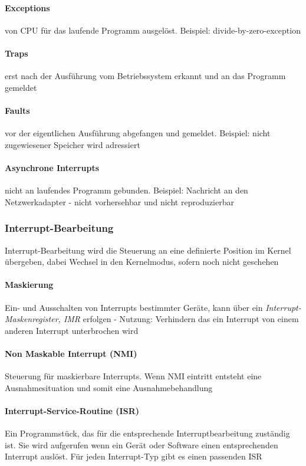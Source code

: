 \documentclass[11pt,a4paper,landscape]{article}
\begin{document}
\begin{multicols*}{3}
	\paragraph{Exceptions} von CPU für das laufende Programm ausgelöst. Beispiel: divide-by-zero-exception
	\paragraph{Traps} erst nach der Ausführung vom Betriebssystem erkannt und an das Programm gemeldet
	\paragraph{Faults} vor der eigentlichen Ausführung abgefangen und gemeldet. Beispiel: nicht zugewiesener Speicher wird adressiert
	\paragraph{Asynchrone Interrupts} nicht an laufendes Programm gebunden. Beispiel: Nachricht an den Netzwerkadapter - nicht vorhersehbar und nicht reproduzierbar
	\subsubsection{Interrupt-Bearbeitung}
	Interrupt-Bearbeitung wird die Steuerung an eine definierte Position im Kernel übergeben, dabei Wechsel in den Kernelmodus, sofern noch nicht geschehen
	\paragraph{Maskierung} Ein- und Ausschalten von Interrupts bestimmter Geräte, kann über ein \textit{Interrupt-Maskenregister, IMR} erfolgen - Nutzung: Verhindern das ein Interrupt von einem anderen Interrupt unterbrochen wird
	\paragraph{Non Maskable Interrupt (NMI)} Steuerung für maskierbare Interrupts. Wenn NMI eintritt entsteht eine Ausnahmesituation und somit eine Ausnahmebehandlung
	\paragraph{Interrupt-Service-Routine (ISR)} Ein Programmstück, das für die entsprechende Interruptbearbeitung zuständig ist. Sie wird aufgerufen wenn ein Gerät oder Software einen entsprechenden Interrupt auslöst. Für jeden Interrupt-Typ gibt es einen passenden ISR

\end{multicols*}
\end{document}
